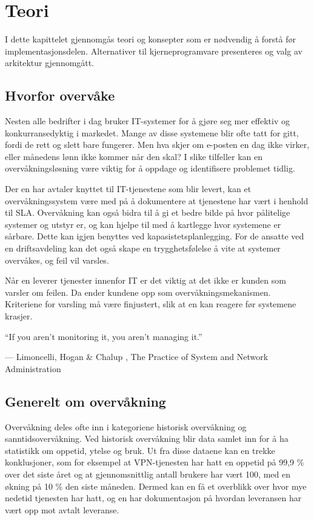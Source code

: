 \chapter{Teori}
I dette kapittelet gjennomgås teori og konsepter som er nødvendig å forstå før implementasjonsdelen. Alternativer til kjerneprogramvare presenteres og valg av arkitektur gjennomgått.
\clearpage
\section{Hvorfor overvåke}
Nesten alle bedrifter i dag bruker IT-systemer for å gjøre seg mer effektiv og konkurransedyktig i markedet. Mange av disse systemene blir ofte tatt for gitt, fordi de rett og slett bare fungerer. Men hva skjer om e-posten en dag ikke virker, eller månedens lønn ikke kommer når den skal? I slike tilfeller kan en overvåkningsløsning være viktig for å oppdage og identifisere problemet tidlig.

Der en har avtaler knyttet til IT-tjenestene som blir levert, kan et overvåkningssystem være med på å dokumentere at tjenestene har vært i henhold til SLA. Overvåkning kan også bidra til å gi et bedre bilde på hvor pålitelige systemer og utstyr er, og kan hjelpe til med å kartlegge hvor systemene er sårbare. Dette kan igjen benyttes ved kapasistetsplanlegging. For de ansatte ved en driftsavdeling kan det også skape en trygghetsfølelse å vite at systemer overvåkes, og feil vil varsles.

Når en leverer tjenester innenfor IT er det viktig at det ikke er kunden som varsler om feilen. Da ender kundene opp som overvåkningsmekanismen. Kriteriene for varsling må være finjustert, slik at en kan reagere før systemene krasjer.

\epigraph{``If you aren’t monitoring it, you aren’t managing it.''}{--- \textup{Limoncelli, Hogan \& Chalup }, The Practice of System and Network Administration\cite{practiceofsystemandnetwork}}

\section{Generelt om overvåkning}\label{sec:omovervakning}
Overvåkning deles ofte inn i kategoriene historisk overvåkning og sanntidsovervåkning. Ved historisk overvåkning blir data samlet inn for å ha statistikk om oppetid, ytelse og bruk. Ut fra disse dataene kan en trekke konklusjoner, som for eksempel at VPN-tjenesten har hatt en oppetid på 99,9 \% over det siste året og at gjennomsnittlig antall brukere har vært 100, med en økning på 10 \% den siste måneden. Dermed kan en få et overblikk over hvor mye nedetid tjenesten har hatt, og en har dokumentasjon på hvordan leveransen har vært opp mot avtalt leveranse.\cite{practiceofsystemandnetwork}


